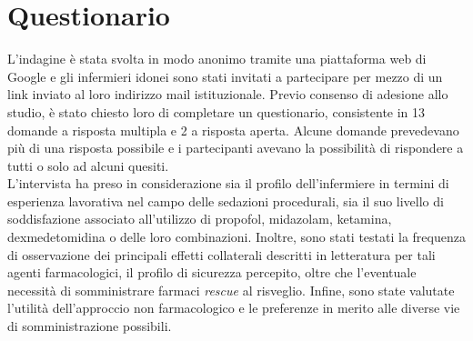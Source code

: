 
\section{Questionario}

L'indagine è stata svolta in modo anonimo tramite una piattaforma web di Google e gli infermieri idonei sono stati invitati a partecipare per mezzo di un link inviato al loro indirizzo mail istituzionale. Previo consenso di adesione allo studio, è stato chiesto loro di completare un questionario, consistente in 13 domande a risposta multipla e 2 a risposta aperta. Alcune domande prevedevano più di una risposta possibile e i partecipanti avevano la possibilità di rispondere a tutti o solo ad alcuni quesiti. 
\\L'intervista ha preso in considerazione sia il profilo dell'infermiere in termini di esperienza lavorativa nel campo delle sedazioni procedurali, sia il suo livello di soddisfazione associato all'utilizzo di propofol, midazolam, ketamina, dexmedetomidina o delle loro combinazioni. Inoltre, sono stati testati la frequenza di osservazione dei principali effetti collaterali descritti in letteratura per tali agenti farmacologici, il profilo di sicurezza percepito, oltre che l'eventuale necessità di somministrare farmaci \emph{rescue} al risveglio. Infine, sono state valutate l'utilità dell'approccio non farmacologico e le preferenze in merito alle diverse vie di somministrazione possibili. 

\newpage

